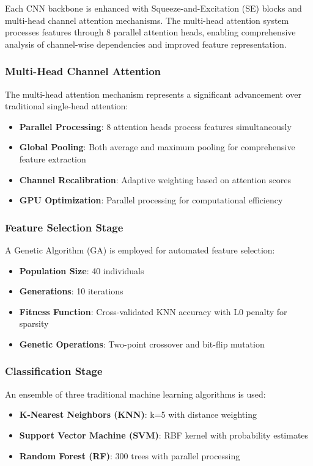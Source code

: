 \documentclass[journal]{IEEEtran}
\begin{document}
Each CNN backbone is enhanced with Squeeze-and-Excitation (SE) blocks and multi-head channel attention mechanisms. The multi-head attention system processes features through 8 parallel attention heads, enabling comprehensive analysis of channel-wise dependencies and improved feature representation.

\subsubsection{Multi-Head Channel Attention}

The multi-head attention mechanism represents a significant advancement over traditional single-head attention:

\begin{itemize}
    \item \textbf{Parallel Processing}: 8 attention heads process features simultaneously
    \item \textbf{Global Pooling}: Both average and maximum pooling for comprehensive feature extraction
    \item \textbf{Channel Recalibration}: Adaptive weighting based on attention scores
    \item \textbf{GPU Optimization}: Parallel processing for computational efficiency
\end{itemize}

\subsubsection{Feature Selection Stage}

A Genetic Algorithm (GA) is employed for automated feature selection:
\begin{itemize}
    \item \textbf{Population Size}: 40 individuals
    \item \textbf{Generations}: 10 iterations
    \item \textbf{Fitness Function}: Cross-validated KNN accuracy with L0 penalty for sparsity
    \item \textbf{Genetic Operations}: Two-point crossover and bit-flip mutation
\end{itemize}

\subsubsection{Classification Stage}

An ensemble of three traditional machine learning algorithms is used:
\begin{itemize}
    \item \textbf{K-Nearest Neighbors (KNN)}: k=5 with distance weighting
    \item \textbf{Support Vector Machine (SVM)}: RBF kernel with probability estimates
    \item \textbf{Random Forest (RF)}: 300 trees with parallel processing
\end{itemize}
\end{document}
